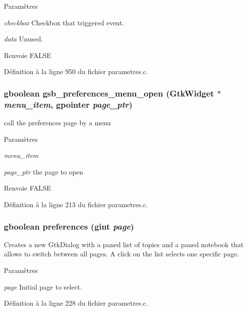 \begin{DoxyParams}{Paramètres}
\item[{\em checkbox}]Checkbox that triggered event. \item[{\em data}]Unused.\end{DoxyParams}
\begin{DoxyReturn}{Renvoie}
FALSE 
\end{DoxyReturn}


Définition à la ligne 950 du fichier parametres.c.

\subsubsection[{gsb\_\-preferences\_\-menu\_\-open}]{\setlength{\rightskip}{0pt plus 5cm}gboolean gsb\_\-preferences\_\-menu\_\-open (GtkWidget $\ast$ {\em menu\_\-item}, \/  gpointer {\em page\_\-ptr})}\label{parametres_8h_a0da746576e2617f919aa2c8047ec3bf0}
call the preferences page by a menu


\begin{DoxyParams}{Paramètres}
\item[{\em menu\_\-item}]\item[{\em page\_\-ptr}]the page to open\end{DoxyParams}
\begin{DoxyReturn}{Renvoie}
FALSE 
\end{DoxyReturn}


Définition à la ligne 213 du fichier parametres.c.

\subsubsection[{preferences}]{\setlength{\rightskip}{0pt plus 5cm}gboolean preferences (gint {\em page})}\label{parametres_8h_a11ca21a8e0c2101e89252e4b391530bf}
Creates a new GtkDialog with a paned list of topics and a paned notebook that allows to switch between all pages. A click on the list selects one specific page.


\begin{DoxyParams}{Paramètres}
\item[{\em page}]Initial page to select. \end{DoxyParams}


Définition à la ligne 228 du fichier parametres.c.

